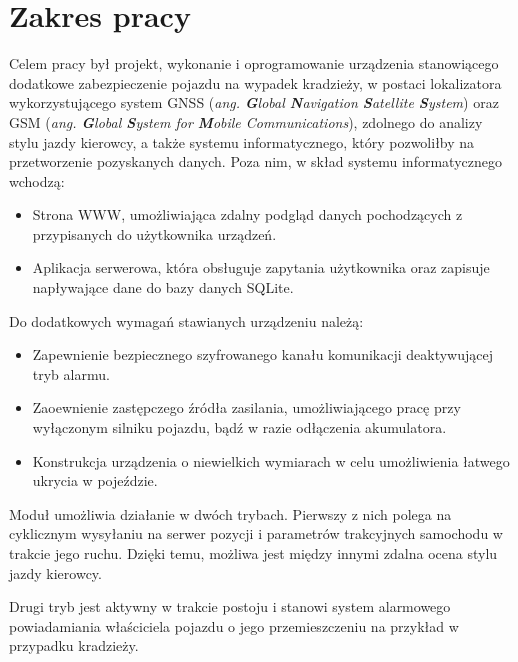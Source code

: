 \section{Zakres pracy}
\label{project_sketch}
Celem pracy był projekt, wykonanie i oprogramowanie urządzenia stanowiącego dodatkowe zabezpieczenie pojazdu na wypadek kradzieży, w postaci lokalizatora wykorzystującego system GNSS (\textit{ang. \textbf{G}lobal \textbf{N}avigation \textbf{S}atellite \textbf{S}ystem}) oraz GSM (\textit{ang. \textbf{G}lobal \textbf{S}ystem for \textbf{M}obile Communications}), zdolnego do analizy stylu jazdy kierowcy, a także systemu informatycznego, który pozwoliłby na przetworzenie pozyskanych danych. Poza nim, w skład systemu informatycznego wchodzą:

\begin{itemize}
\item Strona WWW, umożliwiająca zdalny podgląd danych pochodzących z przypisanych do użytkownika urządzeń.
\item Aplikacja serwerowa, która obsługuje zapytania użytkownika oraz zapisuje napływające dane do bazy danych SQLite.
\end{itemize}

Do dodatkowych wymagań stawianych urządzeniu należą:

\begin{itemize}
\item Zapewnienie bezpiecznego szyfrowanego kanału komunikacji deaktywującej tryb alarmu.
\item Zaoewnienie zastępczego źródła zasilania, umożliwiającego pracę przy wyłączonym silniku pojazdu, bądź w razie odłączenia akumulatora.
\item Konstrukcja urządzenia o niewielkich wymiarach w celu umożliwienia łatwego ukrycia w pojeździe. 
\end{itemize}

Moduł umożliwia działanie w dwóch trybach. Pierwszy z nich polega na cyklicznym wysyłaniu na serwer pozycji i parametrów trakcyjnych samochodu w trakcie jego ruchu. Dzięki temu, możliwa jest między innymi zdalna ocena stylu jazdy kierowcy.

Drugi tryb jest aktywny w trakcie postoju i stanowi system alarmowego powiadamiania właściciela pojazdu o jego przemieszczeniu na przykład w przypadku kradzieży.

